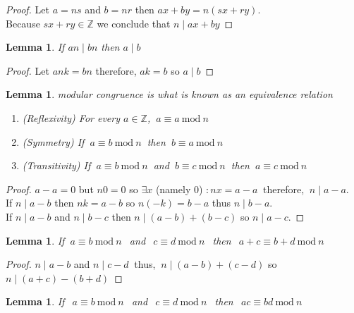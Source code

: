\documentclass[12pt]{extarticle}
\renewcommand\qedsymbol{$\square$}
\newcommand{\divides}{\mid}
\newcommand{\Z}{\mathbb{Z}}
\newtheorem{lemma}[theorem]{Lemma}
\newenvironment{lproof}{\begin{proof} \renewcommand{\qedsymbol}{}}{\end{proof}}
\renewcommand{\mod}[3]{\: #1 \equiv #2 \: \mathrm{mod} \: #3 \:}
\begin{document}
\begin{lproof}
\label{pmlemma}
Let $a = ns$ and $b = nr$ then $ax + by = n(sx + ry)$. \\
Because $sx + ry \in \Z$ we conclude that $n \divides ax+by$ 
\end{lproof}

\begin{lemma} If $an \divides bn$ then $a \divides b$
\end{lemma}

\begin{lproof}
\label{dividecancelation}
Let $ank = bn$ therefore, $ak = b$ so $a \divides b$
\end{lproof}

\begin{lemma} 
modular congruence is what is known as an equivalence relation
\begin{enumerate}
\item (Reflexivity) For every $a \in \Z$, $\mod{a}{a}{n}$
\item (Symmetry) If $\mod{a}{b}{n}$ then $\mod{b}{a}{n}$
\item (Transitivity) If $\mod{a}{b}{n}$ and $ \mod{b}{c}{n}$ then $\mod{a}{c}{n}$
\end{enumerate}
\end{lemma}

\begin{lproof}
$a-a = 0$ but $n   0 = 0$ so $\exists x$ (namely 0) $: nx = a-a \:$ therefore, $\: n \divides a-a$. \\
If $n \divides a-b$ then $nk = a-b$ so $n(-k) = b-a$ thus $n \divides b-a$. \\
If $n \divides a-b$ and $n \divides b-c$ then $n \divides (a-b) + (b-c)$ so $n \divides a-c$.
\end{lproof}

\newpage


\begin{lemma}
\label{modadd}
If $\mod{a}{b}{n} \:$ and $\: \mod{c}{d}{n} \:$ then $\: \mod{a+c}{b+d}{n}$
\end{lemma}

\begin{lproof}
$n \divides a-b$ and $n \divides c-d \:$ thus, $\: n \divides (a-b) + (c-d)$ so $n \divides (a+c)-(b+d)$ 
\end{lproof}

\begin{lemma}
\label{modmult}
If $\: \mod{a}{b}{n} \:$ and $\: \mod{c}{d}{n} \:$ then $\: \mod{ac}{bd}{n}$
\end{lemma}
\end{document}
